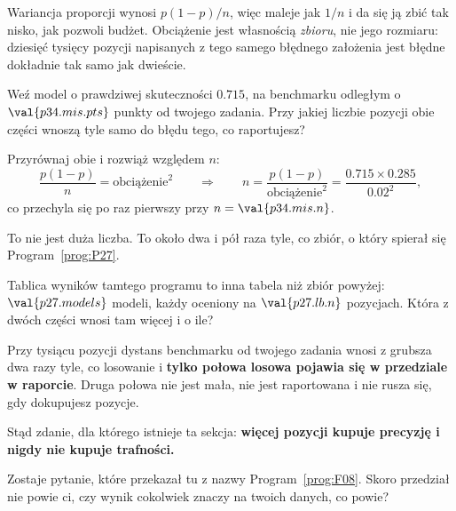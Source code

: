 \begin{fr}

Wariancja proporcji wynosi $p(1-p)/n$, więc maleje jak $1/n$ i da się ją
zbić tak nisko, jak pozwoli budżet. Obciążenie jest własnością \emph{zbioru},
nie jego rozmiaru: dziesięć tysięcy pozycji napisanych z tego samego
błędnego założenia jest błędne dokładnie tak samo jak dwieście.

Weź model o prawdziwej skuteczności $\num{0.715}$, na benchmarku odległym o
$\val{p34.mis.pts}$ punkty od twojego zadania. Przy jakiej liczbie pozycji
obie części wnoszą tyle samo do błędu tego, co raportujesz?
\dotline
\nextframe
\end{fr}

\begin{fr}
\begin{ansblock}
Przyrównaj obie i rozwiąż względem $n$:
\[ \frac{p(1-p)}{n} = \text{obciążenie}^{2}
   \qquad\Longrightarrow\qquad
   n = \frac{p(1-p)}{\text{obciążenie}^{2}}
     = \frac{\num{0.715} \times \num{0.285}}{\num{0.02}^{2}} , \]
co przechyla się po raz pierwszy przy $n = \val{p34.mis.n}$.
\end{ansblock}

To nie jest duża liczba. To około dwa i pół raza tyle, co zbiór, o który
spierał się Program~\ref{prog:P27}.

Tablica wyników tamtego programu to inna tabela niż zbiór powyżej:
$\val{p27.models}$ modeli, każdy oceniony na $\val{p27.lb.n}$ pozycjach.
Która z dwóch części wnosi tam więcej i o ile?
\dotline
\nextframe
\end{fr}

\begin{fr}

Przy tysiącu pozycji dystans benchmarku od twojego zadania wnosi z grubsza
dwa razy tyle, co losowanie \dash{} i \textbf{tylko połowa losowa pojawia się
w przedziale w raporcie}. Druga połowa nie jest mała, nie jest raportowana i
nie rusza się, gdy dokupujesz pozycje.

Stąd zdanie, dla którego istnieje ta sekcja: \textbf{więcej pozycji kupuje
precyzję i nigdy nie kupuje trafności.}

Zostaje pytanie, które przekazał tu z nazwy Program~\ref{prog:F08}. Skoro
przedział nie powie ci, czy wynik cokolwiek znaczy na twoich danych, co
powie?
\dotline
\nextframe
\end{fr}

